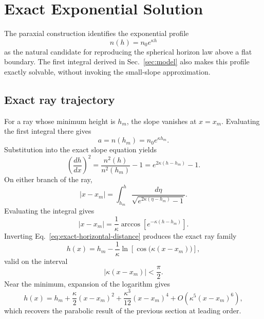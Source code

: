 \section{Exact Exponential Solution}
\label{sec:exact-solution}

The paraxial construction identifies the exponential profile
\begin{equation}
    n(h)=n_0 e^{\kappa h}
    \label{eq:exact-exponential-profile}
\end{equation}
as the natural candidate for reproducing the spherical horizon law above a
flat boundary. The first integral derived in Sec.~\ref{sec:model} also makes
this profile exactly solvable, without invoking the small-slope approximation.

\subsection{Exact ray trajectory}

For a ray whose minimum height is $h_m$, the slope vanishes at
$x=x_m$. Evaluating the first integral there gives
\begin{equation}
    a=n(h_m)=n_0 e^{\kappa h_m}.
\end{equation}
Substitution into the exact slope equation yields
\begin{equation}
    \left(\frac{dh}{dx}\right)^2
    =
    \frac{n^2(h)}{n^2(h_m)}-1
    =
    e^{2\kappa(h-h_m)}-1.
    \label{eq:exact-exponential-slope}
\end{equation}
On either branch of the ray,
\begin{equation}
    \left|x-x_m\right|
    =
    \int_{h_m}^{h}
    \frac{d\eta}
    {\sqrt{e^{2\kappa(\eta-h_m)}-1}}.
\end{equation}
Evaluating the integral gives
\begin{equation}
    \left|x-x_m\right|
    =
    \frac{1}{\kappa}
    \arccos\!\left[e^{-\kappa(h-h_m)}\right].
    \label{eq:exact-horizontal-distance}
\end{equation}
Inverting Eq.~\eqref{eq:exact-horizontal-distance} produces the exact ray
family
\begin{equation}
    h(x)
    =
    h_m
    -
    \frac{1}{\kappa}
    \ln\!\left[
        \cos\!\bigl(\kappa(x-x_m)\bigr)
    \right],
    \label{eq:exact-exponential-ray}
\end{equation}
valid on the interval
\begin{equation}
    \left|\kappa(x-x_m)\right|<\frac{\pi}{2}.
\end{equation}
Near the minimum, expansion of the logarithm gives
\begin{equation}
    h(x)
    =
    h_m
    +
    \frac{\kappa}{2}(x-x_m)^2
    +
    \frac{\kappa^3}{12}(x-x_m)^4
    +
    O\!\left(\kappa^5(x-x_m)^6\right),
    \label{eq:exact-ray-local-expansion}
\end{equation}
which recovers the parabolic result of the previous section at leading
order.

